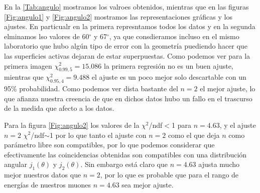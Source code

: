 \documentclass[11pt]{article}
\begin{document}
En la \cref{Tab:angulo} mostramos los valroes obtenidos, mientras que en las figuras \cref{Fig:angulo1} y \cref{Fig:angulo2} mostramos las representaciones gráficas y los ajustes. En particualr en la primera represntamos todos los datos y en la segunda elminamos lso valores de 60$^\circ$ y 67$^\circ$, ya que consdieramos incluso en el mismo laboratorio que hubo algún tipo de error con la geometría puediendo hacer que las superficies activas dejaran de estar superpuestas. Como podemos ver para la primera imagen $\chi^2_{0.99,5}=15.086$ la primera regresión no es un buen ajuste, mientras que $\chi^2_{0.95,4}=9.488$ el ajuste es un poco mejor solo descartable con un 95\% probabilidad. Como podemos ver dista bastante del $n=2$ el mejor ajuste, lo que afianza nuestra creencia de que en dichos datos hubo un fallo en el trascurso de la medida que afecto a los datos. 

Para la figura \cref{Fig:angulo2} los valores de la $\chi^2$/ndf$<$1 para $n=4.63$, y el ajuste $n=2$ $\chi^2$/ndf$\sim$1 por lo que tanto el ajuste con $n=2$ como el que deja $n$ como parámetro libre son compatibles, por lo que podemos considerar que efectivamente las coincidencias obtenidas son compatibles con una distribución angular $j_1(\theta)$ y $j_2(\theta)$. Sin embargo está claro que $n=4.63$ ajusta mucho mejor nuestros datos que $n=2$, por lo que es probable que para el rango de energías de nuestros muones $n=4.63$ sea mejor ajuste.
\end{document}
